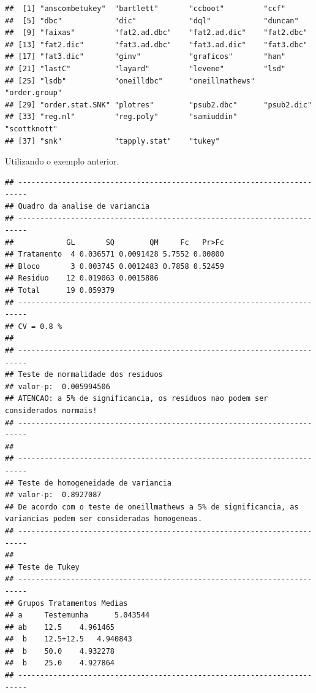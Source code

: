 \documentclass[
]{book}
\newenvironment{Shaded}{\begin{snugshade}}{\end{snugshade}}
\newcommand{\DataTypeTok}[1]{\textcolor[rgb]{0.13,0.29,0.53}{#1}}
\newcommand{\KeywordTok}[1]{\textcolor[rgb]{0.13,0.29,0.53}{\textbf{#1}}}
\newcommand{\NormalTok}[1]{#1}
\newcommand{\OperatorTok}[1]{\textcolor[rgb]{0.81,0.36,0.00}{\textbf{#1}}}
\newcommand{\StringTok}[1]{\textcolor[rgb]{0.31,0.60,0.02}{#1}}
\begin{document}
\begin{verbatim}
##  [1] "anscombetukey"  "bartlett"       "ccboot"         "ccf"           
##  [5] "dbc"            "dic"            "dql"            "duncan"        
##  [9] "faixas"         "fat2.ad.dbc"    "fat2.ad.dic"    "fat2.dbc"      
## [13] "fat2.dic"       "fat3.ad.dbc"    "fat3.ad.dic"    "fat3.dbc"      
## [17] "fat3.dic"       "ginv"           "graficos"       "han"           
## [21] "lastC"          "layard"         "levene"         "lsd"           
## [25] "lsdb"           "oneilldbc"      "oneillmathews"  "order.group"   
## [29] "order.stat.SNK" "plotres"        "psub2.dbc"      "psub2.dic"     
## [33] "reg.nl"         "reg.poly"       "samiuddin"      "scottknott"    
## [37] "snk"            "tapply.stat"    "tukey"
\end{verbatim}

Utilizando o exemplo anterior.

\begin{Shaded}
\end{Shaded}

\begin{verbatim}
## ------------------------------------------------------------------------
## Quadro da analise de variancia
## ------------------------------------------------------------------------
##            GL       SQ        QM     Fc   Pr>Fc
## Tratamento  4 0.036571 0.0091428 5.7552 0.00800
## Bloco       3 0.003745 0.0012483 0.7858 0.52459
## Residuo    12 0.019063 0.0015886               
## Total      19 0.059379                         
## ------------------------------------------------------------------------
## CV = 0.8 %
## 
## ------------------------------------------------------------------------
## Teste de normalidade dos residuos 
## valor-p:  0.005994506 
## ATENCAO: a 5% de significancia, os residuos nao podem ser considerados normais!
## ------------------------------------------------------------------------
## 
## ------------------------------------------------------------------------
## Teste de homogeneidade de variancia 
## valor-p:  0.8927087 
## De acordo com o teste de oneillmathews a 5% de significancia, as variancias podem ser consideradas homogeneas.
## ------------------------------------------------------------------------
## 
## Teste de Tukey
## ------------------------------------------------------------------------
## Grupos Tratamentos Medias
## a     Testemunha      5.043544 
## ab    12.5    4.961465 
##  b    12.5+12.5   4.940843 
##  b    50.0    4.932278 
##  b    25.0    4.927864 
## ------------------------------------------------------------------------
\end{verbatim}
\end{document}
